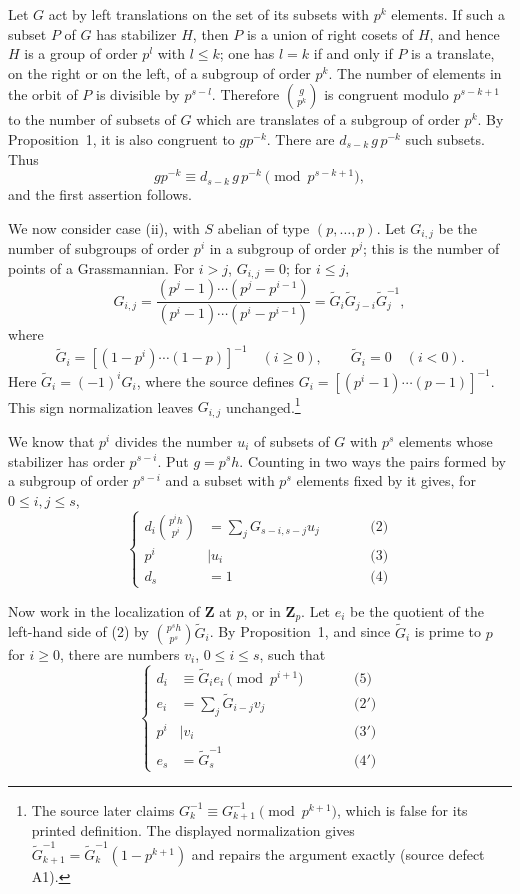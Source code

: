 \documentclass[12pt,reqno]{amsart}
\theoremstyle{plain}
\begin{document}
Let $G$ act by left translations on the set of its subsets with $p^k$ elements. If such a subset $P$ of $G$ has stabilizer $H$, then $P$ is a union of right cosets of $H$, and hence $H$ is a group of order $p^l$ with $l\leq k$; one has $l=k$ if and only if $P$ is a translate, on the right or on the left, of a subgroup of order $p^k$. The number of elements in the orbit of $P$ is divisible by $p^{s-l}$. Therefore $\binom{g}{p^k}$ is congruent modulo $p^{s-k+1}$ to the number of subsets of $G$ which are translates of a subgroup of order $p^k$. By Proposition~1, it is also congruent to $gp^{-k}$. There are $d_{s-k}\,g\,p^{-k}$ such subsets. Thus
\[
gp^{-k}\equiv d_{s-k}\,g\,p^{-k}\pmod {p^{s-k+1}},
\]
and the first assertion follows.

We now consider case (ii), with $S$ abelian of type $(p,\ldots,p)$. Let $G_{i,j}$ be the number of subgroups of order $p^i$ in a subgroup of order $p^j$; this is the number of points of a Grassmannian. For $i>j$, $G_{i,j}=0$; for $i\leq j$,
\[
G_{i,j}=\frac{(p^j-1)\cdots(p^j-p^{i-1})}{(p^i-1)\cdots(p^i-p^{i-1})}
=\widetilde G_i\widetilde G_{j-i}\widetilde G_j^{-1},
\]
where
\[
\widetilde G_i=[(1-p^i)\cdots(1-p)]^{-1}\quad (i\geq 0),
\qquad \widetilde G_i=0\quad (i<0).
\]
Here $\widetilde G_i=(-1)^iG_i$, where the source defines
$G_i=[(p^i-1)\cdots(p-1)]^{-1}$.
This sign normalization leaves $G_{i,j}$ unchanged.\footnote{The source
later claims $G_k^{-1}\equiv G_{k+1}^{-1}\pmod {p^{k+1}}$, which is
false for its printed definition.  The displayed normalization gives
$\widetilde G_{k+1}^{-1}=\widetilde G_k^{-1}(1-p^{k+1})$ and repairs the
argument exactly (source defect A1).}

We know that $p^i$ divides the number $u_i$ of subsets of $G$ with $p^s$ elements whose stabilizer has order $p^{s-i}$. Put $g=p^s h$. Counting in two ways the pairs formed by a subgroup of order $p^{s-i}$ and a subset with $p^s$ elements fixed by it gives, for $0\leq i,j\leq s$,
\[
\left\{
\begin{alignedat}{2}
d_i\binom{p^i h}{p^i}&=\sum_j G_{s-i,s-j}u_j &\qquad& \text{(2)}\\
p^i&\mid u_i && \text{(3)}\\
d_s&=1 && \text{(4)}
\end{alignedat}
\right.
\]

Now work in the localization of $\mathbf Z$ at $p$, or in $\mathbf Z_p$. Let $e_i$ be the quotient of the left-hand side of (2) by $\binom{p^s h}{p^s}\widetilde G_i$. By Proposition~1, and since $\widetilde G_i$ is prime to $p$ for $i\geq 0$, there are numbers $v_i$, $0\leq i\leq s$, such that
\[
\left\{
\begin{alignedat}{2}
d_i&\equiv \widetilde G_i e_i\pmod {p^{i+1}} &\qquad& \text{(5)}\\
e_i&=\sum_j \widetilde G_{i-j}v_j && \text{(2$'$)}\\
p^i&\mid v_i && \text{(3$'$)}\\
e_s&=\widetilde G_s^{-1} && \text{(4$'$)}
\end{alignedat}
\right.
\]
\end{document}
